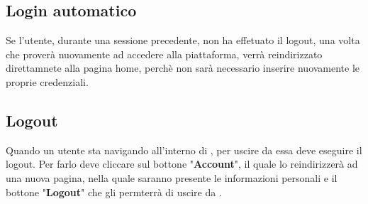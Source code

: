 {    \subsection{Login automatico} {
        Se l'utente, durante una sessione precedente, non ha effetuato il logout, una volta che proverà nuovamente ad accedere alla piattaforma,  
         verrà reindirizzato direttamnete alla pagina home, perchè non sarà necessario inserire nuovamente le proprie credenziali.
    
    }
    
    \subsection{Logout} {
        Quando un utente sta navigando all'interno di \platform, per uscire da essa deve eseguire il logout. Per farlo deve cliccare sul bottone "\textbf{Account}", il quale lo reindirizzerà ad una nuova pagina,
        nella quale saranno presente le informazioni personali e il bottone "\textbf{Logout}" che gli permterrà di uscire da \platform. 
          
    }




}
